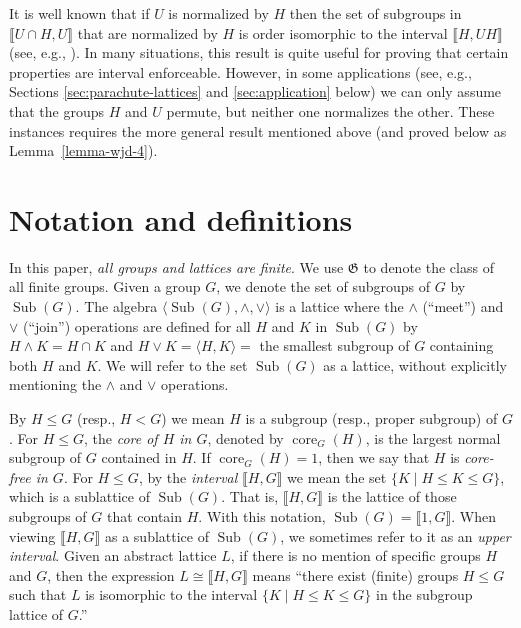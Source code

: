 \documentclass{gen-j-l}
\newcommand{\lb}{\ensuremath{\llbracket}}
\newcommand{\rb}{\ensuremath{\rrbracket}}
\newcommand{\<}{\ensuremath{\langle}}
\renewcommand{\>}{\ensuremath{\rangle}}
\theoremstyle{plain}
\theoremstyle{definition}
\theoremstyle{remark}
\numberwithin{theorem}{section}
\numberwithin{claim}{section}
\numberwithin{equation}{section}
\numberwithin{conjecture}{section}
\newcommand{\defn}[1]{\emph{#1}}
\renewcommand{\leq}{\ensuremath{\leqslant}}
\newcommand{\meet}{\ensuremath{\wedge}}
\newcommand{\join}{\ensuremath{\vee}}
\newcommand{\Sub}{\ensuremath{\operatorname{Sub}}}
\newcommand{\core}{\ensuremath{\operatorname{core}}}
\newcommand{\2}{\ensuremath{\mathbf{2}}}
\newcommand{\3}{\ensuremath{\mathbf{3}}}
\newcommand{\G}{\ensuremath{\mathfrak{G}}}
\begin{document}
It is well known that if $U$ is normalized by $H$ then the
set %
of subgroups in $\lb U\cap H, U \rb$ that are normalized by $H$ is order isomorphic
to the interval $\lb H, UH \rb$ (see, e.g.,
\cite{Borner:1999}). In many situations, this result is quite useful for proving
that certain properties are interval enforceable.  However, in some applications
(see, e.g., Sections \ref{sec:parachute-lattices} and \ref{sec:application}
below) %
we can only assume that the groups $H$ and $U$ permute, but neither one normalizes
the other.
These instances requires the more general result mentioned above (and proved
below as Lemma~\ref{lemma-wjd-4}). 

\section{Notation and definitions}
\label{sec:notation-definitions}
In this paper, \emph{all groups and lattices are finite}.  We use 
$\G$ to denote the class of all finite groups.
Given a group $G$, we denote the set of subgroups of $G$ by $\Sub(G)$.  The
algebra $\<\Sub(G), \meet, \join\>$ is a lattice where the $\meet$ (``meet'') and
$\join$ (``join'') operations are defined for all $H$ and $K$ in $\Sub(G)$ by
$H\meet K = H\cap K$ and $H\join K = \<H, K\> = $ the smallest subgroup of $G$
containing both $H$ and $K$.  We will refer to the set
$\Sub(G)$ as a lattice, without explicitly mentioning the $\meet$ and
$\join$ operations.

By $H \leq G$ (resp.,
$H < G$) we mean $H$ is a subgroup (resp., proper subgroup) of $G$.
For $H\leq G$, the
\emph{core of $H$ in $G$}, denoted by $\core_G(H)$, is the largest normal subgroup of $G$
contained in $H$.
If $\core_G(H)=1$, then we say that $H$ is \emph{core-free in $G$}.
For $H\leq G$,
by the \defn{interval} $\lb H, G \rb$ we mean 
the set $\{K \mid H\leq K \leq G\}$, which is a
sublattice of $\Sub(G)$.
That is, $\lb H,G \rb$ is the lattice of those subgroups of $G$ that contain 
$H$. 
With this notation, $\Sub(G)=\lb 1,G \rb$.
When viewing $\lb H,G \rb$ as a
sublattice of $\Sub(G)$, we sometimes refer to it as an \defn{upper interval}. 
Given an abstract lattice $L$, if there is no mention of specific groups $H$ and
$G$, then the expression $L \cong \lb H, G \rb$ means ``there exist (finite) groups $H
\leq G$ such that $L$ is isomorphic to the interval $\{K \mid H\leq K \leq G\}$ in
the subgroup lattice of $G$.''  
\end{document}
